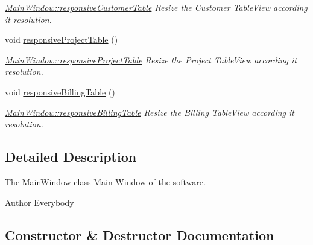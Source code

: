 \begin{DoxyCompactItemize}
\begin{DoxyCompactList}\small\item\em \hyperlink{classGui_1_1MainWindow_a0bf829effb9cb3e42ba063335a15cf3d}{Main\+Window\+::responsive\+Customer\+Table} Resize the Customer Table\+View according it resolution. \end{DoxyCompactList}\item 
\hypertarget{classGui_1_1MainWindow_af7402e6aa57ddf139ba82fb49c497cab}{}void \hyperlink{classGui_1_1MainWindow_af7402e6aa57ddf139ba82fb49c497cab}{responsive\+Project\+Table} ()\label{classGui_1_1MainWindow_af7402e6aa57ddf139ba82fb49c497cab}

\begin{DoxyCompactList}\small\item\em \hyperlink{classGui_1_1MainWindow_af7402e6aa57ddf139ba82fb49c497cab}{Main\+Window\+::responsive\+Project\+Table} Resize the Project Table\+View according it resolution. \end{DoxyCompactList}\item 
\hypertarget{classGui_1_1MainWindow_aff185fab5a7499468d8523d4db1592c9}{}void \hyperlink{classGui_1_1MainWindow_aff185fab5a7499468d8523d4db1592c9}{responsive\+Billing\+Table} ()\label{classGui_1_1MainWindow_aff185fab5a7499468d8523d4db1592c9}

\begin{DoxyCompactList}\small\item\em \hyperlink{classGui_1_1MainWindow_aff185fab5a7499468d8523d4db1592c9}{Main\+Window\+::responsive\+Billing\+Table} Resize the Billing Table\+View according it resolution. \end{DoxyCompactList}\end{DoxyCompactItemize}


\subsection{Detailed Description}
The \hyperlink{classGui_1_1MainWindow}{Main\+Window} class Main Window of the software. 

\begin{DoxyAuthor}{Author}
Everybody 
\end{DoxyAuthor}


\subsection{Constructor \& Destructor Documentation}
\hypertarget{classGui_1_1MainWindow_a5ea8e526d288b96595618942d44154d3}{}
